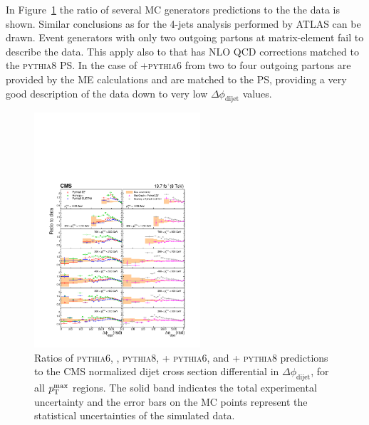 \documentclass{PoS}
\providecommand{\dphi}{\ensuremath{\Delta\phi_\text{dijet}}\xspace}
\providecommand{\ptmax}{\ensuremath{\pt^{\text{max}}}\xspace}
\providecommand{\PYTHIAS} {{\textsc{pythia6}}\xspace}
\providecommand{\PYTHIAE} {{\textsc{pythia8}}\xspace}
\begin{document}
In Figure~\ref{fig:dijet_ratios_MC_data} the ratio of several MC generators predictions to
the the data is shown. Similar conclusions as for the 4-jets analysis performed by ATLAS can be drawn. Event generators with only two outgoing
partons at matrix-element fail to describe the data. This apply also to \POWHEG that has NLO 
QCD corrections matched to the \PYTHIAE PS. In the case of \MADGRAPH+\PYTHIAS from two to four outgoing partons are
provided by the ME calculations and are matched to the PS, providing a very good description of the data down to very
low \dphi values.  
\begin{figure}[hbtp]
  \centering
  \includegraphics[width=0.55\textwidth]{Figure8.pdf}
  \caption{Ratios of \PYTHIAS, \HERWIGpp, \PYTHIAE, \MADGRAPH + \PYTHIAS, and
    \POWHEG + \PYTHIAE predictions to the CMS normalized dijet cross
    section differential in \dphi, for all \ptmax regions.
    The solid band indicates the total experimental uncertainty and
    the error bars on the MC points represent the statistical
    uncertainties of the simulated data.}
  \label{fig:dijet_ratios_MC_data}
\end{figure}
\end{document}
